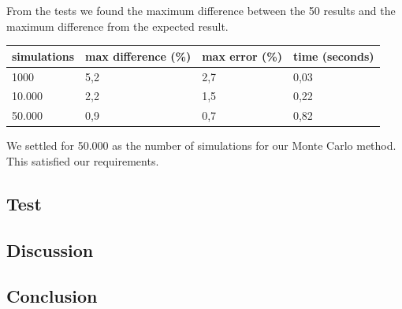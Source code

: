 From the tests we found the maximum difference between the 50 results and the maximum difference from the expected result.

\vspace{4mm}
\begin{tabular}{ | l | l | l | l | }
  \hline
  simulations & max difference (\%) & max error (\%) & time (seconds) \\
  \hline                       
  1000 & 5,2 & 2,7 & 0,03 \\
  10.000 & 2,2 & 1,5 &  0,22\\
  50.000 & 0,9 & 0,7 & 0,82\\
  \hline  
\end{tabular}
\vspace{4mm}

We settled for 50.000 as the number of simulations for our Monte Carlo method. This satisfied our requirements.

\subsection{Test}


\subsection{Discussion}

\subsection{Conclusion}